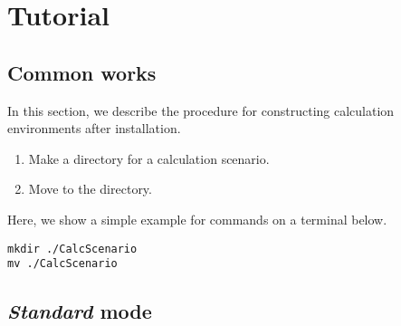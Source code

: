 \chapter{Tutorial}
\label{Ch:model}
\section{Common works}
In this section, we describe the procedure for constructing calculation environments after installation.
\begin{enumerate}
\item Make a directory for a calculation scenario.
%
\item Move to the directory.
\end{enumerate}
Here, we show a simple example for commands on a terminal below.\\
\begin{minipage}{10cm}
\begin{screen}
\begin{verbatim}
mkdir ./CalcScenario
mv ./CalcScenario
\end{verbatim}
\end{screen}
\end{minipage}

\section{{\it Standard} mode}


